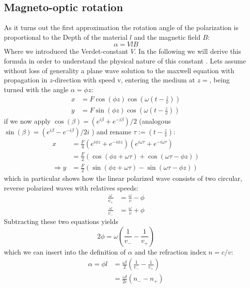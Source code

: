 \subsection{Magneto-optic rotation}
As it turns out the first approximation the rotation angle of the polarization is proportional
to the Depth of the material $l$ and the magnetic field $B$:
\begin{equation}
    \alpha = V l B
\end{equation}
Where we introduced the Verdet-constant $V$. In the following we will derive this formula in order
to understand the physical nature of this constant \cite{staatsexamen}.
Lets assume without loss of generality a plane wave solution to the maxwell equation
with propagation in $z$-direction with speed v, 
entering the medium at $z=$, being turned with the angle
$\alpha = \phi  z$:
\begin{align}
x &= F \cos{(\phi z)} \cos{\left ( \omega \left ( t - \frac{z}{v} \right )\right)} \\ 
y &= F \sin{(\phi z)} \cos{\left ( \omega \left ( t - \frac{z}{v} \right )\right)}
\end{align}
if we now apply $\cos(\beta) = (e^{i\beta} + e^{-i\beta})/2$ 
(analogous $\sin(\beta) = (e^{i\beta} - e^{-i\beta})/2i$ )
and rename $\tau := (t-\frac{z}{v})$:
\begin{align}
x &= \frac{F}{4} \left (e ^{i\phi z} + e ^{-i\phi z} \right )
\left (e ^{i\omega \tau} + e ^{-i\omega \tau} \right ) \\ 
&= \frac{F}{2} \left ( \cos{(\phi z + \omega \tau)} + \cos{(\omega \tau -  \phi z )} \right ) \\
\Rightarrow y &= \frac{F}{2} \left ( \sin{(\phi z + \omega \tau)} - \sin{(\omega \tau -  \phi z )} \right )
\end{align}
which in particular shows how the linear polarized wave consists of two circular, reverse polarized
waves with relatives speeds:
\begin{align}
\frac{\omega}{v_+} &= \frac{\omega}{v} - \phi \label{eq:v+}\\ 
\frac{\omega}{v_-} &= \frac{\omega}{v} + \phi \label{eq:v-}
\end{align}
Subtracting these two equations yields
\begin{equation}
2\phi = \omega \left (\frac{1}{v_-} - \frac{1}{v_+} \right)
\end{equation}
which we can insert into the definition of $\alpha$ and the refraction index $n = c/v$:
\begin{align}
\alpha = \phi l &= \frac{\omega l}{2} \left (\frac{1}{v_-} - \frac{1}{v_+} \right) \\ 
 &= \frac{\omega l}{2c} \left (n_- - n_+ \right)
\end{align}
